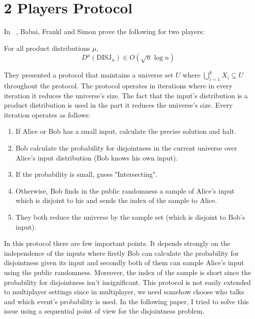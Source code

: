 \section{2 Players Protocol}
In ~\cite{BFS86}, Babai, Frankl and Simon prove the following for two players:
\begin{theorem}
For all product distributions $\mu$, 
\begin{equation*}
    D^{\mu}(\text{DISJ}_n) \in O(\sqrt{n}\log{n})
\end{equation*}
\end{theorem}
They presented a protocol that maintains a universe set $U$ where $\bigcup_{i=1}^k X_i \subseteq U$ throughout the protocol. \newline
The protocol operates in iterations where in every iteration it reduces the universe's size. \newline
The fact that the input's distribution is a product distribution is used in the part it reduces the universe's size.
Every iteration operates as follows: \newline
\begin{enumerate}
    \item If Alice or Bob has a small input, calculate the precise solution and halt.
    \item Bob calculate the probability for disjointness in the current universe over Alice's input distribution (Bob knows his own input).
    \item If the probability is small, guess "Intersecting".
    \item Otherwise, Bob finds in the public randomness a sample of Alice's input which is disjoint to his and sends the index of the sample to Alice.
    \item They both reduce the universe by the sample set (which is disjoint to Bob's input).
\end{enumerate}
In this protocol there are few important points. It depends strongly on the independence of the inputs where firstly Bob can calculate the probability for disjointness given its input and secondly both of them can sample Alice's input using the public randomness. Moreover, the index of the sample is short since the probability for disjointness isn't insignificant. \newline
This protocol is not easily extended to multiplayer settings since in multiplayer, we need somehow choose who talks and which event's probability is used. \newline
In the following paper, I tried to solve this issue using a sequential point of view for the disjointness problem.
